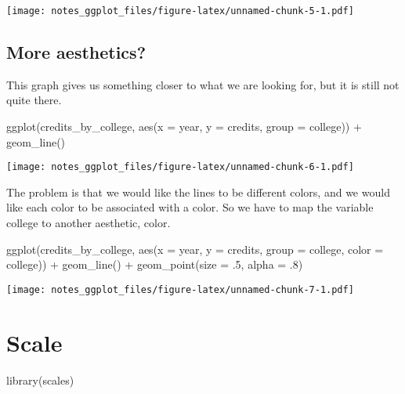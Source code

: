 \documentclass[
]{book}
\newenvironment{Shaded}{\begin{snugshade}}{\end{snugshade}}
\newcommand{\AttributeTok}[1]{\textcolor[rgb]{0.77,0.63,0.00}{#1}}
\newcommand{\DecValTok}[1]{\textcolor[rgb]{0.00,0.00,0.81}{#1}}
\newcommand{\FunctionTok}[1]{\textcolor[rgb]{0.00,0.00,0.00}{#1}}
\newcommand{\NormalTok}[1]{#1}
\newcommand{\SpecialCharTok}[1]{\textcolor[rgb]{0.00,0.00,0.00}{#1}}
\begin{document}
\texttt{[image: notes\_ggplot\_files/figure-latex/unnamed-chunk-5-1.pdf]}

\hypertarget{more-aesthetics}{%
\subsection{More aesthetics?}\label{more-aesthetics}}

This graph gives us something closer to what we are looking for, but it is still not quite there.

\begin{Shaded}
\begin{Highlighting}[]
\FunctionTok{ggplot}\NormalTok{(credits\_by\_college, }\FunctionTok{aes}\NormalTok{(}\AttributeTok{x =}\NormalTok{ year, }\AttributeTok{y =}\NormalTok{ credits, }\AttributeTok{group =}\NormalTok{ college)) }\SpecialCharTok{+} \FunctionTok{geom\_line}\NormalTok{()}
\end{Highlighting}
\end{Shaded}

\texttt{[image: notes\_ggplot\_files/figure-latex/unnamed-chunk-6-1.pdf]}

The problem is that we would like the lines to be different colors, and we would like each color to be associated with a color. So we have to map the variable college to another aesthetic, color.

\begin{Shaded}
\begin{Highlighting}[]
\FunctionTok{ggplot}\NormalTok{(credits\_by\_college, }\FunctionTok{aes}\NormalTok{(}\AttributeTok{x =}\NormalTok{ year, }\AttributeTok{y =}\NormalTok{ credits, }\AttributeTok{group =}\NormalTok{ college, }\AttributeTok{color =}\NormalTok{ college)) }\SpecialCharTok{+} 
  \FunctionTok{geom\_line}\NormalTok{() }\SpecialCharTok{+} \FunctionTok{geom\_point}\NormalTok{(}\AttributeTok{size =}\NormalTok{ .}\DecValTok{5}\NormalTok{, }\AttributeTok{alpha =}\NormalTok{ .}\DecValTok{8}\NormalTok{)}
\end{Highlighting}
\end{Shaded}

\texttt{[image: notes\_ggplot\_files/figure-latex/unnamed-chunk-7-1.pdf]}

\hypertarget{scale}{%
\section{Scale}\label{scale}}

\begin{Shaded}
\begin{Highlighting}[]
\FunctionTok{library}\NormalTok{(scales)}
\end{Highlighting}
\end{Shaded}
\end{document}
